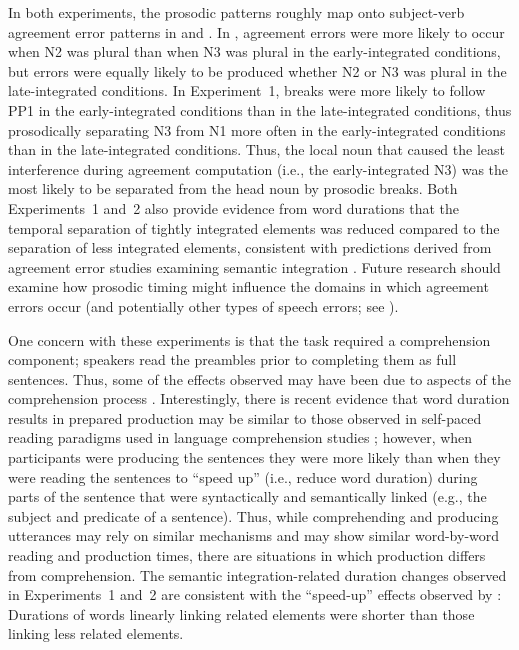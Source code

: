 \documentclass[12pt,titlepage]{article}
\newcommand{\NOTE}[1]{\textbf{*** #1 ***}}  %
\newcommand{\IGNORE}[1]{} %
\begin{document}
In both experiments, the prosodic patterns roughly map onto subject-verb agreement error patterns in  and .  In \citeauthor{GillespiePearlmutter11}, agreement errors were more likely to occur when N2 was plural than when N3 was plural in the early-integrated conditions, but errors were equally likely to be produced whether N2 or N3 was plural in the late-integrated conditions. In Experiment~1, breaks were more likely to follow PP1 in the early-integrated conditions than in the late-integrated conditions, thus prosodically separating N3 from N1 more often in the early-integrated conditions than in the late-integrated conditions. Thus, the local noun that caused the least interference during agreement computation (i.e., the early-integrated N3) was the most likely to be separated from the head noun by prosodic breaks. Both Experiments~1 and~2 also provide evidence from word durations that the temporal separation of tightly integrated elements was reduced compared to the separation of less integrated elements, consistent with predictions derived from agreement error studies examining semantic integration \cite{GillespiePearlmutter11, SolomonPearlmutter04}. Future research should examine how prosodic timing might influence the domains in which agreement errors occur (and potentially other types of speech errors; see ). 


One concern with these experiments is that the task required a comprehension component; speakers read the preambles prior to completing them as full sentences.  Thus, some of the effects observed may have been due to aspects of the comprehension process \cite<for discussion of this concern see>{GillespiePearlmutter11, HaskellMacDonald03, HaskellMacDonald05}.  Interestingly, there is recent evidence that word duration results in prepared production may be similar to those observed in self-paced reading paradigms used in language comprehension studies \cite{SantiEtAlETAP11}; however, when participants were producing the sentences they were more likely than when they were reading the sentences to ``speed up'' (i.e., reduce word duration) during parts of the sentence that were syntactically and semantically linked (e.g., the subject and predicate of a sentence). Thus, while comprehending and producing utterances may rely on similar mechanisms and may show similar word-by-word reading and production times, there are situations in which production differs from comprehension. The semantic integration-related duration changes observed in Experiments~1 and~2 are consistent with the ``speed-up'' effects observed by : Durations of words linearly linking related elements were shorter than those linking less related elements.
\IGNORE{
\NOTE{I will provide more detail about the study above if we decide to keep something like this. I just don't have the paper yet (since it'll be in the same issue). I've already emailed the authors in hopes of getting more information.}}
\end{document}

